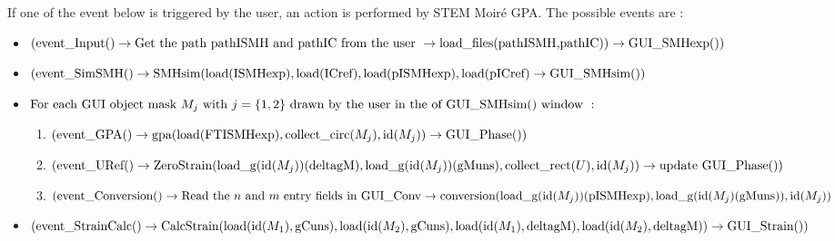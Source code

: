 \documentclass[12pt, titlepage]{article}
\newcommand{\progname}{STEM Moir{\'e} GPA}
\begin{document}
\begin{itemize}
If one of the event below is triggered by the user, an action is performed by \progname{}. The possible events are :
	\begin{itemize}
	\item $(\text{event{\_}Input()} \\ \rightarrow \text{Get the path pathISMH and pathIC from the user} \  \rightarrow \\ \text{load{\_}files(pathISMH,pathIC)})\rightarrow \text{GUI{\_}SMHexp}())$
	\item $(\text{event{\_}SimSMH()} \rightarrow \\ \text{SMHsim}(\text{load(ISMHexp)},\text{load(ICref)}, \text{load(pISMHexp)},\text{load(pICref)} \\ \rightarrow \text{GUI{\_}SMHsim}())$
	\item $\text{For each GUI object mask } M_j \text{ with } j=\{1,2\} \\ \text{ drawn by the user in the of GUI{\_}SMHsim() window }: $
		\begin{enumerate}
		\item $(\text{event{\_}GPA()} \rightarrow  \text{gpa}(\text{load(FTISMHexp)},\text{collect{\_}circ}(M_j),\text{id}(M_j)) \\ \rightarrow \text{GUI{\_}Phase}())$
		\item $(\text{event{\_}URef()} \rightarrow \\ \text{ZeroStrain}(\text{load{\_}g}(\text{id}(M_j))(\text{deltagM}),\text{load{\_}g}(\text{id}(M_j))(\text{gMuns}),\\ \text{collect{\_}rect}(U),\text{id}(M_j))\rightarrow \text{update GUI{\_}Phase}())$
		\item $(\text{event{\_}Conversion()} \rightarrow \text{Read the $n$ and $m$ entry fields in GUI{\_}Conv} \rightarrow \\ \text{conversion}(\text{load{\_}g}(\text{id}(M_j))(\text{pISMHexp}),\text{load{\_}g}(\text{id}(M_j)(\text{gMuns})),\text{id}(M_j))$
		\end{enumerate}
	\item $(\text{event{\_}StrainCalc()} \rightarrow \\
	 \text{CalcStrain}(\text{load}(\text{id}(M_1),\text{gCuns}),\text{load}(\text{id}(M_2),\text{gCuns}),\text{load}(\text{id}(M_1),\text{deltagM}),\\ \text{load}(\text{id}(M_2),\text{deltagM})) \rightarrow \text{GUI{\_}Strain}())$
	\end{itemize}
\end{itemize}
\end{document}
